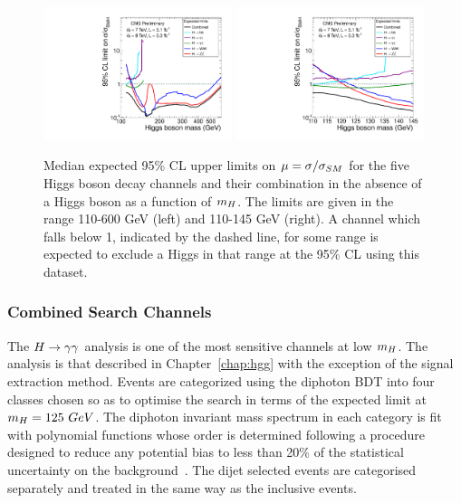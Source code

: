 \begin{figure}
\begin{center}
	\includegraphics[width=0.49\textwidth]{combinations/ichep2012/Figure_001-a.pdf}
	\includegraphics[width=0.49\textwidth]{combinations/ichep2012/Figure_001-b.pdf}
	\caption{Median expected 95\% CL upper limits on $\mu=\sigma/\sigma_{SM}$ 
	for the five Higgs boson decay channels and their combination in the absence
	of a Higgs boson as a function of $m_{H}$. The limits are given in the range 
	110-600 GeV (left) and 110-145 GeV (right). A channel which falls below 1,
	indicated by the dashed line, for some range is expected to exclude a Higgs 
	in that range at the 95\% CL using this dataset.}
	\label{fig:expectedlimits}
\end{center}
\end{figure}

\subsubsection{Combined Search Channels}
The $H\rightarrow\gamma\gamma$ analysis is one of the most sensitive channels at low $m_{H}$. The 
analysis is that described in Chapter~\ref{chap:hgg} with the exception of
the signal extraction method. Events are categorized using the diphoton BDT into 
four classes chosen so as to optimise the search in terms of the expected limit
at $m_{H}=125~GeV$. The diphoton invariant mass spectrum in each category is fit 
with polynomial functions whose order is determined following a procedure designed
to reduce any potential bias to less than 20\% of the statistical uncertainty on 
the background~\citep{HIG-12-015}. The dijet selected events are 
categorised separately and treated in the same way as the inclusive events.

